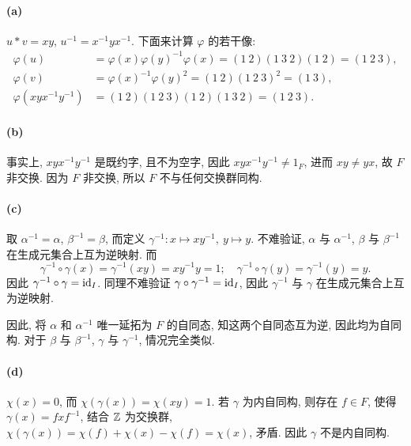 \documentclass{article}
\begin{document}
\begin{solution}
	\paragraph{(a)} $u*v = xy$, $u^{-1} = x^{-1}yx^{-1}$. 下面来计算 $\varphi$ 的若干像:
	\begin{align*}
		\varphi(u) &= \varphi(x) \varphi(y)^{-1} \varphi(x)
		= (1\ 2) (1\ 3\ 2) (1\ 2) = (1\ 2\ 3), \\
		\varphi(v) &= \varphi(x)^{-1} \varphi(y)^{2} 
		=(1\ 2) (1\ 2\ 3)^2 = (1\ 3), \\
		\varphi(xyx^{-1}y^{-1}) &= (1\ 2) (1\ 2\ 3) (1\ 2) (1\ 3\ 2)
		= (1\ 2\ 3).
	\end{align*}

	\paragraph{(b)} 事实上, $xyx^{-1}y^{-1}$ 是既约字, 且不为空字, 因此 $xyx^{-1}y^{-1} \neq 1_F$, 进而 $xy \neq yx$, 故 $F$ 非交换. 因为 $F$ 非交换, 所以 $F$ 不与任何交换群同构.

	\paragraph{(c)} 取 $\alpha^{-1} = \alpha$, $\beta^{-1} = \beta$, 而定义 $\gamma^{-1}: x \mapsto xy^{-1},\ y \mapsto y$. 不难验证, $\alpha$ 与 $\alpha^{-1}$, $\beta$ 与 $\beta^{-1}$ 在生成元集合上互为逆映射. 而
	\[ \gamma^{-1} \circ \gamma (x) = \gamma^{-1} (xy) = xy^{-1} y = 1; \quad \gamma^{-1} \circ \gamma (y) = \gamma^{-1} (y) = y. \]
	因此 $\gamma^{-1} \circ \gamma = \operatorname{id}_I$. 同理不难验证 $\gamma \circ \gamma^{-1} = \operatorname{id}_I$, 因此 $\gamma^{-1}$ 与 $\gamma$ 在生成元集合上互为逆映射. 

	因此, 将 $\alpha$ 和 $\alpha^{-1}$ 唯一延拓为 $F$ 的自同态, 知这两个自同态互为逆, 因此均为自同构. 对于 $\beta$ 与 $\beta^{-1}$, $\gamma$ 与 $\gamma^{-1}$, 情况完全类似.

	\paragraph{(d)} $\chi(x) = 0$, 而 $\chi(\gamma(x)) = \chi(xy) = 1$. 若 $\gamma$ 为内自同构, 则存在 $f \in F$, 使得 $\gamma(x) = fxf^{-1}$, 结合 $\mathbb{Z}$ 为交换群, $\chi(\gamma(x)) = \chi(f)+\chi(x)-\chi(f) = \chi(x)$, 矛盾. 因此 $\gamma$ 不是内自同构.
\end{solution}
\end{document}
